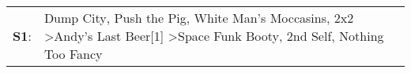 \begin{supertabular}{p{0.03\textwidth}p{0.92\textwidth}}
 \textbf{S1}:  &  Dump City\textsuperscript{}, \enspace Push the Pig\textsuperscript{}, \enspace White Man's Moccasins\textsuperscript{}, \enspace 2x2\textsuperscript{} \textgreater \enspace Andy's Last Beer[1]\textsuperscript{} \textgreater \enspace Space Funk Booty\textsuperscript{}, \enspace 2nd Self\textsuperscript{}, \enspace Nothing Too Fancy\textsuperscript{}  \enspace  \\
\end{supertabular}
